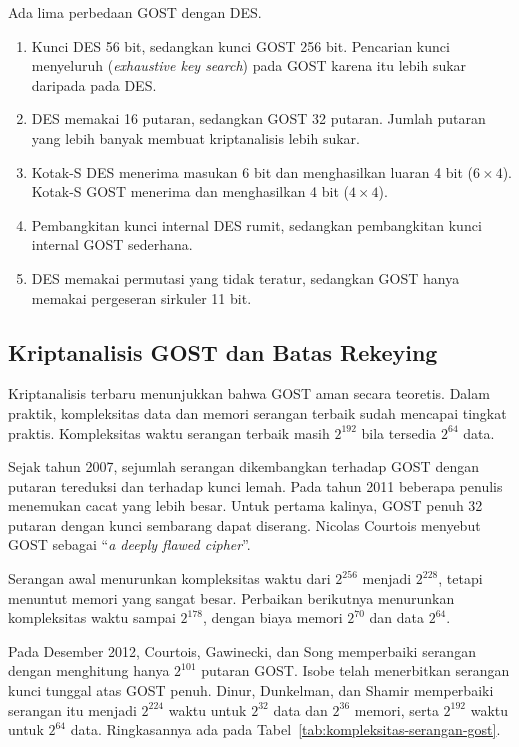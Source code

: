 Ada lima perbedaan GOST dengan DES.
\begin{enumerate}
    \item Kunci DES 56 bit, sedangkan kunci GOST 256 bit. Pencarian kunci
          menyeluruh (\textit{exhaustive key search}) pada GOST karena itu lebih
          sukar daripada pada DES.
    \item DES memakai 16 putaran, sedangkan GOST 32 putaran. Jumlah putaran yang
          lebih banyak membuat kriptanalisis lebih sukar.
    \item Kotak-S DES menerima masukan 6 bit dan menghasilkan luaran 4 bit
          ($6 \times 4$). Kotak-S GOST menerima dan menghasilkan 4 bit
          ($4 \times 4$).
    \item Pembangkitan kunci internal DES rumit, sedangkan pembangkitan kunci
          internal GOST sederhana.
    \item DES memakai permutasi yang tidak teratur, sedangkan GOST hanya memakai
          pergeseran sirkuler 11 bit.
\end{enumerate}

\subsection{Kriptanalisis GOST dan Batas Rekeying}
\label{subsec:kriptanalisis-gost}

Kriptanalisis terbaru menunjukkan bahwa GOST aman secara teoretis. Dalam praktik,
kompleksitas data dan memori serangan terbaik sudah mencapai tingkat praktis.
Kompleksitas waktu serangan terbaik masih $2^{192}$ bila tersedia $2^{64}$ data.

Sejak tahun 2007, sejumlah serangan dikembangkan terhadap GOST dengan putaran
tereduksi dan terhadap kunci lemah. Pada tahun 2011 beberapa penulis menemukan
cacat yang lebih besar. Untuk pertama kalinya, GOST penuh 32 putaran dengan kunci
sembarang dapat diserang. Nicolas Courtois menyebut GOST sebagai
``\textit{a deeply flawed cipher}''.

Serangan awal menurunkan kompleksitas waktu dari $2^{256}$ menjadi $2^{228}$,
tetapi menuntut memori yang sangat besar. Perbaikan berikutnya menurunkan
kompleksitas waktu sampai $2^{178}$, dengan biaya memori $2^{70}$ dan data
$2^{64}$.

Pada Desember 2012, Courtois, Gawinecki, dan Song memperbaiki serangan dengan
menghitung hanya $2^{101}$ putaran GOST. Isobe telah menerbitkan serangan kunci
tunggal atas GOST penuh. Dinur, Dunkelman, dan Shamir memperbaiki serangan itu
menjadi $2^{224}$ waktu untuk $2^{32}$ data dan $2^{36}$ memori, serta $2^{192}$
waktu untuk $2^{64}$ data. Ringkasannya ada pada
Tabel~\ref{tab:kompleksitas-serangan-gost}.

